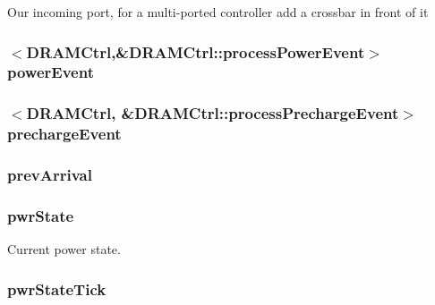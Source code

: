 \label{classDRAMCtrl_a55c076720c982014096b57cadebf9a14}
Our incoming port, for a multi-\/ported controller add a crossbar in front of it \hypertarget{classDRAMCtrl_afb2cbddd4a31e9a3b11886230f18f44b}{
\subsubsection[{powerEvent}]{$<${\bf DRAMCtrl},\&DRAMCtrl::processPowerEvent$>$ {\bf powerEvent}}}
\label{classDRAMCtrl_afb2cbddd4a31e9a3b11886230f18f44b}
\hypertarget{classDRAMCtrl_a80cac8f63f85f5c7781367b8b728750f}{
\subsubsection[{prechargeEvent}]{$<${\bf DRAMCtrl}, \&DRAMCtrl::processPrechargeEvent$>$ {\bf prechargeEvent}}}
\label{classDRAMCtrl_a80cac8f63f85f5c7781367b8b728750f}
\hypertarget{classDRAMCtrl_ae3e56b38f5969512cd915824ec1d5740}{
\subsubsection[{prevArrival}]{ {\bf prevArrival}}}
\label{classDRAMCtrl_ae3e56b38f5969512cd915824ec1d5740}
\hypertarget{classDRAMCtrl_a9c9c5adc18a56a35103536d6afddfd5f}{
\subsubsection[{pwrState}]{ {\bf pwrState}}}
\label{classDRAMCtrl_a9c9c5adc18a56a35103536d6afddfd5f}
Current power state. \hypertarget{classDRAMCtrl_a06e80ba25d388ee981f9c88e27e189df}{
\subsubsection[{pwrStateTick}]{ {\bf pwrStateTick}}}
